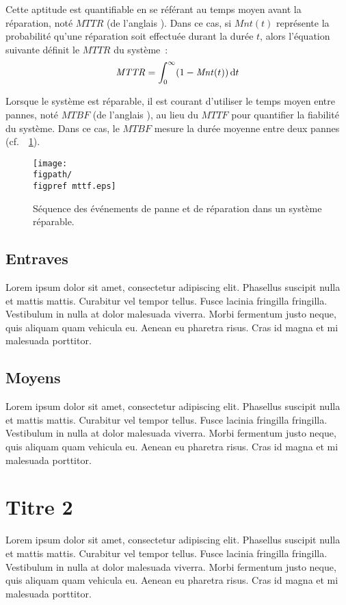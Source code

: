 Cette aptitude est quantifiable en se référant au temps moyen avant la réparation,
noté $\mathit{MTTR}$ (de l'anglais ).
Dans ce cas, si $\mathit{Mnt}(t)$ représente la probabilité qu'une réparation soit effectuée
durant la durée $t$, alors l'équation suivante définit le $\mathit{MTTR}$ du système~:
\begin{equation}
\mathit{MTTR} = \int_{0}^{\infty} (1 - \mathit{Mnt}(t)) \mathop{}\!\mathrm{d} t
\end{equation}

Lorsque le système est réparable, il est courant d'utiliser le temps moyen
entre pannes, noté $\mathit{MTBF}$ (de l'anglais ),
au lieu du $\mathit{MTTF}$ pour quantifier la fiabilité du système.
Dans ce cas, le $\mathit{MTBF}$ mesure la durée moyenne entre deux
pannes (cf.\ \figurename~\ref{fig:tf_mttf}).

\begin{figure}
	\centering
	\texttt{[image: \\figpath/\\figpref mttf.eps]}
	\caption{\label{fig:tf_mttf}Séquence des événements de panne et de réparation dans un système réparable.}
\end{figure}

\subsection{Entraves}
Lorem ipsum dolor sit amet, consectetur adipiscing elit. Phasellus suscipit nulla et mattis mattis. Curabitur vel tempor tellus. 
Fusce lacinia fringilla fringilla. Vestibulum in nulla at dolor malesuada viverra. Morbi fermentum justo neque, quis aliquam quam vehicula eu. 
Aenean eu pharetra risus. Cras id magna et mi malesuada porttitor.

\subsection{Moyens}
Lorem ipsum dolor sit amet, consectetur adipiscing elit. Phasellus suscipit nulla et mattis mattis. Curabitur vel tempor tellus. 
Fusce lacinia fringilla fringilla. Vestibulum in nulla at dolor malesuada viverra. Morbi fermentum justo neque, quis aliquam quam vehicula eu. 
Aenean eu pharetra risus. Cras id magna et mi malesuada porttitor.

\section{Titre 2}
Lorem ipsum dolor sit amet, consectetur adipiscing elit. Phasellus suscipit nulla et mattis mattis. Curabitur vel tempor tellus. 
Fusce lacinia fringilla fringilla. Vestibulum in nulla at dolor malesuada viverra. Morbi fermentum justo neque, quis aliquam quam vehicula eu. 
Aenean eu pharetra risus. Cras id magna et mi malesuada porttitor.

